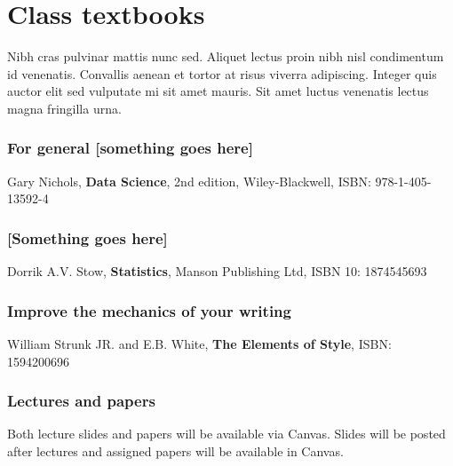 \documentclass[11pt,]{article}
\begin{document}
\hypertarget{class-textbooks}{%
\section{Class textbooks}\label{class-textbooks}}

Nibh cras pulvinar mattis nunc sed. Aliquet lectus proin nibh nisl
condimentum id venenatis. Convallis aenean et tortor at risus viverra
adipiscing. Integer quis auctor elit sed vulputate mi sit amet mauris.
Sit amet luctus venenatis lectus magna fringilla urna.

\hypertarget{for-general-something-goes-here}{%
\subsubsection{For general {[}something goes
here{]}}\label{for-general-something-goes-here}}

Gary Nichols, \textbf{Data Science}, 2nd edition, Wiley-Blackwell, ISBN:
978-1-405-13592-4

\hypertarget{something-goes-here}{%
\subsubsection{{[}Something goes here{]}}\label{something-goes-here}}

Dorrik A.V. Stow, \textbf{Statistics}, Manson Publishing Ltd, ISBN 10:
1874545693

\hypertarget{improve-the-mechanics-of-your-writing}{%
\subsubsection{Improve the mechanics of your
writing}\label{improve-the-mechanics-of-your-writing}}

William Strunk JR. and E.B. White, \textbf{The Elements of Style}, ISBN:
1594200696

\hypertarget{lectures-and-papers}{%
\subsubsection{Lectures and papers}\label{lectures-and-papers}}

Both lecture slides and papers will be available via Canvas. Slides will
be posted after lectures and assigned papers will be available in
Canvas.

\newpage
\end{document}
